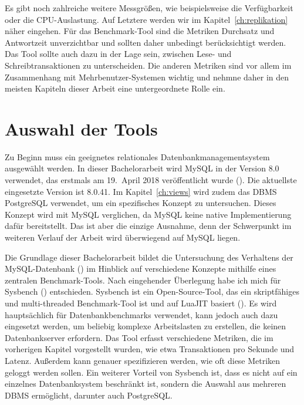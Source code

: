 Es gibt noch zahlreiche weitere Messgrößen, wie beispielsweise die Verfügbarkeit oder die CPU-Auslastung.
Auf Letztere werden wir im Kapitel~\ref{ch:replikation} näher eingehen.
Für das Benchmark-Tool sind die Metriken Durchsatz und Antwortzeit unverzichtbar und sollten daher unbedingt berücksichtigt werden.
Das Tool sollte auch dazu in der Lage sein, zwischen Lese- und Schreibtransaktionen zu unterscheiden.
Die anderen Metriken sind vor allem im Zusammenhang mit Mehrbenutzer-Systemen wichtig und nehmne daher in den meisten Kapiteln dieser Arbeit eine untergeordnete Rolle ein.

\section{Auswahl der Tools}\label{sec:auswahl-der-tools}

Zu Beginn muss ein geeignetes relationales Datenbankmanagementsystem ausgewählt werden.
In dieser Bachelorarbeit wird MySQL in der Version 8.0 verwendet, das erstmals am 19.\ April 2018 veröffentlicht wurde (\cite{mysql_release}).
Die aktuellste eingesetzte Version ist 8.0.41.
Im Kapitel~\ref{ch:views} wird zudem das DBMS PostgreSQL verwendet, um ein spezifisches Konzept zu untersuchen.
Dieses Konzept wird mit MySQL verglichen, da MySQL keine native Implementierung dafür bereitstellt.
Das ist aber die einzige Ausnahme, denn der Schwerpunkt im weiteren Verlauf der Arbeit wird überwiegend auf MySQL liegen.

Die Grundlage dieser Bachelorarbeit bildet die Untersuchung des Verhaltens der MySQL-Datenbank (\cite{sysbench_mysql}) im Hinblick auf verschiedene Konzepte mithilfe eines zentralen Benchmark-Tools.
Nach eingehender Überlegung habe ich mich für Sysbench (\cite{sysbench_repo}) entschieden.
Sysbench ist ein Open-Source-Tool, das ein skriptfähiges und multi-threaded Benchmark-Tool ist und auf LuaJIT basiert (\cite[pp. 50--66]{schwartz2012high}).
Es wird hauptsächlich für Datenbankbenchmarks verwendet, kann jedoch auch dazu eingesetzt werden, um beliebig komplexe Arbeitslasten zu erstellen, die keinen Datenbankserver erfordern.
Das Tool erfasst verschiedene Metriken, die im vorherigen Kapitel vorgestellt wurden, wie etwa Transaktionen pro Sekunde und Latenz.
Außerdem kann genauer spezifizieren werden, wie oft diese Metriken geloggt werden sollen.
Ein weiterer Vorteil von Sysbench ist, dass es nicht auf ein einzelnes Datenbanksystem beschränkt ist, sondern die Auswahl aus mehreren DBMS ermöglicht, darunter auch PostgreSQL\@.

